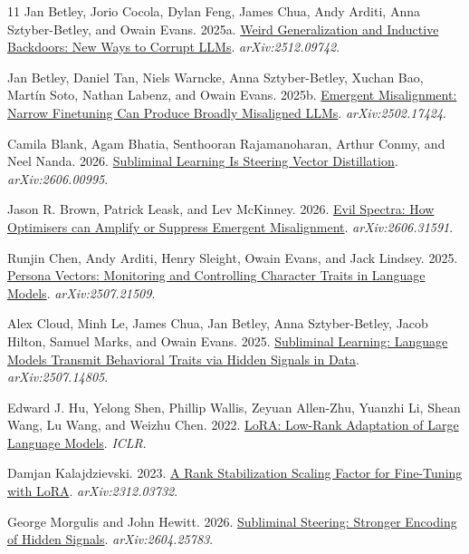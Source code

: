 \begin{thebibliography}{11}
Jan Betley, Jorio Cocola, Dylan Feng, James Chua, Andy Arditi, Anna Sztyber-Betley, and Owain Evans. 2025a.
\href{https://arxiv.org/abs/2512.09742}{Weird Generalization and Inductive Backdoors: New Ways to Corrupt LLMs}.
\emph{arXiv:2512.09742}.

Jan Betley, Daniel Tan, Niels Warncke, Anna Sztyber-Betley, Xuchan Bao, Mart\'in Soto, Nathan Labenz, and Owain Evans. 2025b.
\href{https://arxiv.org/abs/2502.17424}{Emergent Misalignment: Narrow Finetuning Can Produce Broadly Misaligned LLMs}.
\emph{arXiv:2502.17424}.

Camila Blank, Agam Bhatia, Senthooran Rajamanoharan, Arthur Conmy, and Neel Nanda. 2026.
\href{https://arxiv.org/abs/2606.00995}{Subliminal Learning Is Steering Vector Distillation}.
\emph{arXiv:2606.00995}.

Jason R. Brown, Patrick Leask, and Lev McKinney. 2026.
\href{https://arxiv.org/abs/2606.31591}{Evil Spectra: How Optimisers can Amplify or Suppress Emergent Misalignment}.
\emph{arXiv:2606.31591}.

Runjin Chen, Andy Arditi, Henry Sleight, Owain Evans, and Jack Lindsey. 2025.
\href{https://arxiv.org/abs/2507.21509}{Persona Vectors: Monitoring and Controlling Character Traits in Language Models}.
\emph{arXiv:2507.21509}.

Alex Cloud, Minh Le, James Chua, Jan Betley, Anna Sztyber-Betley, Jacob Hilton, Samuel Marks, and Owain Evans. 2025.
\href{https://arxiv.org/abs/2507.14805}{Subliminal Learning: Language Models Transmit Behavioral Traits via Hidden Signals in Data}.
\emph{arXiv:2507.14805}.

Edward J. Hu, Yelong Shen, Phillip Wallis, Zeyuan Allen-Zhu, Yuanzhi Li, Shean Wang, Lu Wang, and Weizhu Chen. 2022.
\href{https://arxiv.org/abs/2106.09685}{LoRA: Low-Rank Adaptation of Large Language Models}.
\emph{ICLR}.

Damjan Kalajdzievski. 2023.
\href{https://arxiv.org/abs/2312.03732}{A Rank Stabilization Scaling Factor for Fine-Tuning with LoRA}.
\emph{arXiv:2312.03732}.

George Morgulis and John Hewitt. 2026.
\href{https://arxiv.org/abs/2604.25783}{Subliminal Steering: Stronger Encoding of Hidden Signals}.
\emph{arXiv:2604.25783}.


\end{thebibliography}
